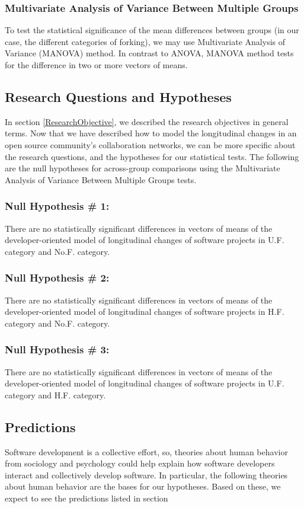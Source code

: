 \documentclass[11pt]{report}
\begin{document}
\subsubsection{Multivariate Analysis of Variance Between Multiple Groups}
\label{MANOVA}
To test the statistical significance of the mean differences between groups (in our case, the different categories of forking), we may use Multivariate Analysis of Variance (MANOVA) method. In contrast to ANOVA, MANOVA method tests for the difference in two or more vectors of means. 

\subsection{Research Questions and Hypotheses}
\label{RQs}
In section \ref{ResearchObjective}, we described the research objectives in general terms. Now that we have described how to model the longitudinal changes in an open source community's collaboration networks, we can be more specific about the research questions, and the hypotheses for our statistical tests. The following are the null hypotheses for across-group comparisons using the Multivariate Analysis of Variance Between Multiple Groups tests.

\subsubsection{Null Hypothesis \# 1:} 
There are no statistically significant differences in vectors of means of the developer-oriented model of longitudinal changes of software projects in U.F. category and No.F. category.

\subsubsection{Null Hypothesis \# 2:} 
There are no statistically significant differences in vectors of means of the developer-oriented model of longitudinal changes of software projects in H.F. category and No.F. category.

\subsubsection{Null Hypothesis \# 3:} 
There are no statistically significant differences in vectors of means of the developer-oriented model of longitudinal changes of software projects in U.F. category and H.F. category.


\subsection{Predictions}
Software development is a collective effort, so, theories about human behavior from sociology and psychology could help explain how software developers interact and collectively develop software. In particular, the following theories about human behavior are the bases for our hypotheses. Based on these, we expect to see the predictions listed in section \
\end{document}
